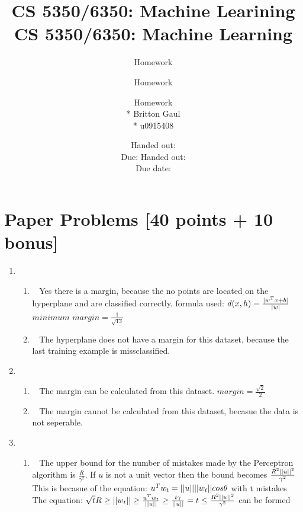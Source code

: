 \documentclass[12pt, fullpage,letterpaper]{article}
\title{CS 5350/6350: Machine Learining \semester}
\author{Homework \assignmentId}
\date{Handed out: \releaseDate\\
	Due: \dueDate}
\title{CS 5350/6350: Machine Learning \semester}
\author{Homework \assignmentId}
\date{Handed out: \releaseDate\\
  Due date: \dueDate}
\author{Homework \assignmentId \\* Britton Gaul \\* u0915408}
\begin{document}
\maketitle


\newcommand{\Hcal}{\mathcal{H}} 


\section{Paper Problems [40 points + 10 bonus]}
\begin{enumerate}
	\item~
	\begin{enumerate}
	\item~
	\newline Yes there is a margin, because the no points are located on the hyperplane and are classified correctly. 
	\newline formula used: $d(x, h)=\frac{\lvert w^T x+ b\rvert}{\lvert w\rvert}$
	\newline $minimum$ $margin = \frac{1}{\sqrt{13}}$
	
	
	\item~
	\newline The hyperplane does not have a margin for this dataset, because the last training example is missclassified. 
	
	\end{enumerate}
	

		\item~  
		\begin{enumerate}
			
			
			\item~ The margin can be calculated from this dataset. 
			\newline $margin = \frac{\sqrt{2}}{2}$
			
			\item~
			\newline The margin cannot be calculated from this dataset, becasue the data is not seperable. 
			
		\end{enumerate}
	
	\item ~
	\begin{enumerate}
		\item~
		\newline The upper bound for the number of mistakes made by the Perceptron algorithm is $\frac{R}{\gamma^2}$.
		\newline If $u$ is not a unit vector then the bound becomes $\frac{R^2\lvert\lvert u\rvert\rvert^2}{\gamma^2}$
		\newline This is becasue of the equation:
		\newline $u^Tw_t=\lvert\lvert u\rvert\rvert\lvert\lvert w_t\rvert\rvert cos\theta$ with t mistakes
		\newline The equation:
		\newline $\sqrt{t}R\ge \lvert\lvert w_t\rvert\rvert \ge \frac{u^Tw_t}{\lvert\lvert u\rvert\rvert} \ge \frac{t\gamma}{\lvert\lvert u\rvert\rvert} = t \le \frac{R^2\lvert\lvert u\rvert\rvert^2}{\gamma^2}$ can be formed


\end{enumerate}
\end{enumerate}
\end{document}
